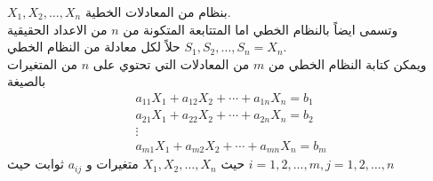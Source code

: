 $X_1, X_2 , \dots, X_n$
بنظام من المعادلات الخطية.\\ 
\noindent
وتسمى ايضاً بالنظام الخطي اما المتتابعة المتكونة من $n$ من الاعداد الحقيقية $S_1 , S_2, \dots, S_n=X_n$ حلاً لكل معادلة من النظام الخطي.\\
\noindent
ويمكن كتابة النظام الخطي من $m$ من المعادلات التي تحتوي على $n$ من المتغيرات بالصيغة
\begin{equation*}
	\begin{gathered}
		a_{11}X_1 + a_{12}X_2 + \cdots + a_{1n} X_n = b_1\\
		a_{21}X_1 + a_{22}X_2 + \cdots + a_{2n} X_n = b_2\\
		\vdots\\
		a_{m1}X_1 + a_{m2}X_2 + \cdots + a_{mn} X_n = b_m
	\end{gathered}
\end{equation*}
حيث $X_1 , X_2, \dots,X_n$ متغيرات و $a_{ij}$ ثوابت حيث 
$i=1,2,\dots,m, j=1,2,\dots,n$

